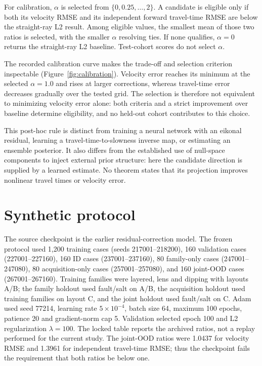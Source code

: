 \documentclass[11pt]{article}
\begin{document}
For calibration, $\alpha$ is selected from $\{0,0.25,\ldots,2\}$. A candidate is eligible only if both its velocity RMSE and its independent forward travel-time RMSE are below the straight-ray L2 result. Among eligible values, the smallest mean of those two ratios is selected, with the smaller $\alpha$ resolving ties. If none qualifies, $\alpha=0$ returns the straight-ray L2 baseline. Test-cohort scores do not select $\alpha$.

The recorded calibration curve makes the trade-off and selection criterion inspectable (Figure~\ref{fig:calibration}). Velocity error reaches its minimum at the selected $\alpha=1.0$ and rises at larger corrections, whereas travel-time error decreases gradually over the tested grid. The selection is therefore not equivalent to minimizing velocity error alone: both criteria and a strict improvement over baseline determine eligibility, and no held-out cohort contributes to this choice.

This post-hoc rule is distinct from training a neural network with an eikonal residual, learning a travel-time-to-slowness inverse map, or estimating an ensemble posterior. It also differs from the established use of null-space components to inject external prior structure: here the candidate direction is supplied by a learned estimate. No theorem states that its projection improves nonlinear travel times or velocity error.

\section{Synthetic protocol}
The source checkpoint is the earlier residual-correction model. The frozen protocol used 1,200 training cases (seeds 217001--218200), 160 validation cases (227001--227160), 160 ID cases (237001--237160), 80 family-only cases (247001--247080), 80 acquisition-only cases (257001--257080), and 160 joint-OOD cases (267001--267160). Training families were layered, lens and dipping with layouts A/B; the family holdout used fault/salt on A/B, the acquisition holdout used training families on layout C, and the joint holdout used fault/salt on C. Adam used seed 77214, learning rate $5\times10^{-4}$, batch size 64, maximum 100 epochs, patience 20 and gradient-norm cap 5. Validation selected epoch 100 and L2 regularization $\lambda=100$. The locked table reports the archived ratios, not a replay performed for the current study. The joint-OOD ratios were 1.0437 for velocity RMSE and 1.3961 for independent travel-time RMSE; thus the checkpoint fails the requirement that both ratios be below one.
\end{document}
